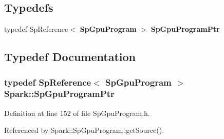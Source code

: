 \subsection*{Typedefs}
\begin{CompactItemize}
\item 
typedef Sp\-Reference$<$ {\bf Sp\-Gpu\-Program} $>$ {\bf Sp\-Gpu\-Program\-Ptr}
\end{CompactItemize}


\subsection{Typedef Documentation}
\subsubsection{\setlength{\rightskip}{0pt plus 5cm}typedef Sp\-Reference$<$ {\bf Sp\-Gpu\-Program} $>$ {\bf Spark::Sp\-Gpu\-Program\-Ptr}}\label{namespaceSpark_a0}


Definition at line 152 of file Sp\-Gpu\-Program.h.

Referenced by Spark::Sp\-Gpu\-Program::get\-Source().